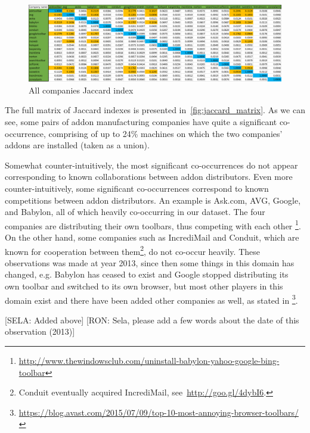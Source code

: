 \documentclass[11pt,oneside]{book}
\begin{document}
\begin{figure}[h]
\centering
\includegraphics[width=\linewidth]{figures/JaccardMatrix.png}
\caption{All companies Jaccard index}
\label{fig:jaccard_matrix}
\end{figure}

The full matrix of Jaccard indexes is presented in~\autoref{fig:jaccard_matrix}. As we can see, some pairs of addon manufacturing companies have quite a significant co-occurrence, comprising of up to 24\% machines on which the two companies' addons are installed (taken as a union). 

Somewhat counter-intuitively, the most significant co-occurrences do not appear corresponding to known collaborations between addon distributors. Even more counter-intuitively, some significant co-occurrences correspond to known competitions between addon distributors. An example is Ask.com, AVG, Google, and Babylon, all of which heavily co-occurring in our dataset. The four companies are distributing their own toolbars, thus competing with each other \footnote{\url{http://www.thewindowsclub.com/uninstall-babylon-yahoo-google-bing-toolbar}}. On the other hand, some companies such as IncrediMail and Conduit, which are known for cooperation between them\footnote{Conduit eventually acquired IncrediMail, see~\url{http://goo.gl/4dybI6}.}, do not co-occur heavily.
These observations was made at year 2013, since then some things in this domain has changed, e.g. Babylon has ceased to exist and Google stopped distributing its own toolbar and switched to its own browser, but most other players in this domain exist and there have been added other companies as well, as stated in \footnote{\url{https://blog.avast.com/2015/07/09/top-10-most-annoying-browser-toolbars/}}.

[SELA: Added above]
[RON: Sela, please add a few words about the date of this observation (2013)]
\end{document}
